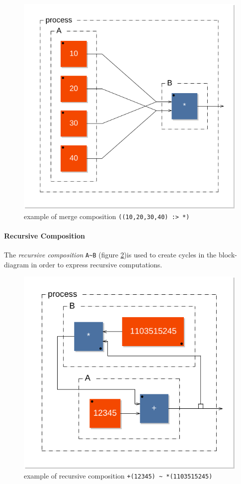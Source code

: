 \documentclass[a4paper]{book}
\begin{document}
\begin{figure}[h]
\centering 
\includegraphics[scale=0.7]{images/merge1} 
\caption{example of merge composition \lstinline'((10,20,30,40) :> *)'}  
\label{figure:merge1}
\end{figure}
 

\paragraph{Recursive Composition}
    The \emph{recursive composition} \lstinline'A~B' (figure \ref{figure:rec1})is used to create cycles in the block-diagram in order to express recursive computations.
    
    \begin{figure}[h]
    \centering 
    \includegraphics[scale=0.7]{images/rec1} 
    \caption{example of recursive composition \lstinline'+(12345) ~ *(1103515245)'}  
    \label{figure:rec1}
    \end{figure}
 
\end{document}

